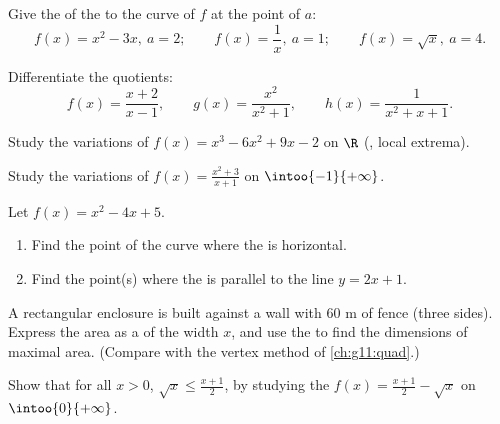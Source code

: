 \begin{exercise}[$\star$]\label{exo:g11:deriv:3}
Give the  of the  to the curve of $f$ at the point of
 $a$:
\[
f(x) = x^2 - 3x, \ a = 2; \qquad
f(x) = \frac1x, \ a = 1; \qquad
f(x) = \sqrt x, \ a = 4 .
\]
\end{exercise}

\begin{exercise}[$\star$]\label{exo:g11:deriv:4}
Differentiate the quotients:
\[
f(x) = \frac{x+2}{x-1}, \qquad
g(x) = \frac{x^2}{x^2+1}, \qquad
h(x) = \frac{1}{x^2 + x + 1} .
\]
\end{exercise}

\begin{exercise}[$\star\star$]\label{exo:g11:deriv:5}
Study the variations of $f(x) = x^3 - 6x^2 + 9x - 2$ on $\R$ (, local extrema).
\end{exercise}

\begin{exercise}[$\star\star$]\label{exo:g11:deriv:6}
Study the variations of $f(x) = \frac{x^2 + 3}{x + 1}$ on
$\intoo{-1}{+\infty}$.
\end{exercise}

\begin{exercise}[$\star\star$]\label{exo:g11:deriv:7}
Let $f(x) = x^2 - 4x + 5$.
\begin{enumerate}
  \item Find the point of the curve where the  is horizontal.
  \item Find the point(s) where the  is parallel to the line
        $y = 2x + 1$.
\end{enumerate}
\end{exercise}

\begin{exercise}[$\star\star$]\label{exo:g11:deriv:8}
A rectangular enclosure is built against a wall with $60$ m of fence
(three sides). Express the area as a  of the width $x$, and use
the  to find the dimensions of maximal area. (Compare with the
vertex method of \cref{ch:g11:quad}.)
\end{exercise}

\begin{exercise}[$\star\star$]\label{exo:g11:deriv:9}
Show that for all $x > 0$, $\sqrt{x} \leq \frac{x + 1}{2}$, by studying
the  $f(x) = \frac{x+1}{2} - \sqrt x$ on $\intoo{0}{+\infty}$.
\end{exercise}

